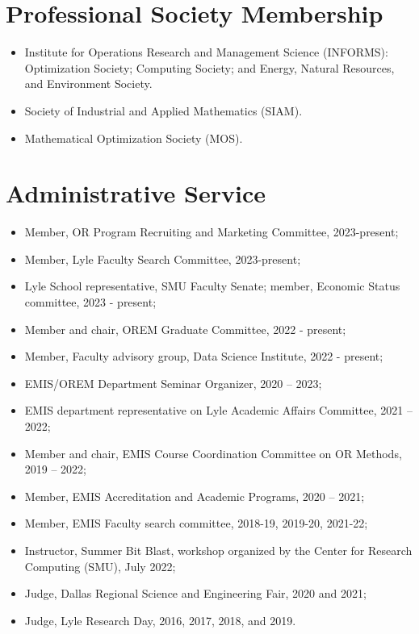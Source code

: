 \documentclass[hyperref, margin]{myResume}
\begin{document}
\begin{resume}
\section{Professional Society Membership}
		\begin{itemize}[leftmargin=1em]
			\item Institute for Operations Research and Management Science (INFORMS): Optimization Society; Computing Society; and Energy, Natural Resources, and Environment Society.
			\item Society of Industrial and Applied Mathematics (SIAM).
			\item Mathematical Optimization Society (MOS).
		\end{itemize}
	
\section{Administrative Service}
	\begin{itemize}[leftmargin=*]
		\item Member, OR Program Recruiting and Marketing Committee, 2023-present;
		\item Member, Lyle Faculty Search Committee, 2023-present;
		\item Lyle School representative, SMU Faculty Senate; member, Economic Status committee, 2023 - present;
		\item Member and chair, OREM Graduate Committee, 2022 - present;
		\item Member, Faculty advisory group, Data Science Institute, 2022 - present;
		\item EMIS/OREM Department Seminar Organizer, 2020 -- 2023;
		\item EMIS department representative on Lyle Academic Affairs Committee, 2021 -- 2022;
		\item Member and chair, EMIS Course Coordination Committee on OR Methods, 2019 -- 2022;
		\item Member, EMIS Accreditation and Academic Programs, 2020 -- 2021;
		\item Member, EMIS Faculty search committee, 2018-19, 2019-20, 2021-22;
		\item Instructor, Summer Bit Blast, workshop organized by the Center for Research Computing (SMU), July 2022;
		\item Judge, Dallas Regional Science and Engineering Fair, 2020 and 2021;
		\item Judge, Lyle Research Day, 2016, 2017, 2018, and 2019.
	\end{itemize}
	

\end{resume}
\end{document}
